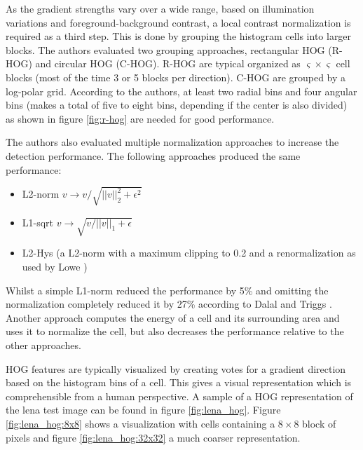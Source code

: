 As the gradient strengths vary over a wide range, based on illumination variations and foreground-background contrast, a local contrast normalization is required as a third step. This is done by grouping the histogram cells into larger blocks. The authors evaluated two grouping approaches, rectangular HOG (\acs{R-HOG}) and circular HOG (\acs{C-HOG}). \acs{R-HOG} are typical organized as $\varsigma \times \varsigma$ cell blocks (most of the time 3 or 5 blocks per direction). \acs{C-HOG} are grouped by a log-polar grid. According to the authors, at least two radial bins and four angular bins (makes a total of five to eight bins, depending if the center is also divided) as shown in figure \ref{fig:r-hog} are needed for good performance.



The authors also evaluated multiple normalization approaches to increase the detection performance.
The following approaches produced the same performance:
\begin{itemize}
	\item L2-norm $v \rightarrow v / \sqrt{||v||_2^2 + \epsilon^2}$
	\item L1-sqrt $v \rightarrow \sqrt{v / ||v||_1 + \epsilon}$
	\item L2-Hys (a L2-norm with a maximum clipping to 0.2 and a renormalization as used by Lowe \cite{Lowe2004})
\end{itemize}
Whilst a simple L1-norm reduced the performance by 5\% and omitting the normalization completely reduced it by 27\% according to Dalal and Triggs \cite{Dalal2005}. Another approach computes the energy of a cell and its surrounding area and uses it to normalize the cell, but also decreases the performance relative to the other approaches.

\ac{HOG} features are typically visualized by creating votes for a gradient direction based on the histogram bins of a cell. This gives a visual representation which is comprehensible from a human perspective. A sample of a \ac{HOG} representation of the lena test image can be found in figure \ref{fig:lena_hog}. Figure \ref{fig:lena_hog:8x8} shows a visualization with cells containing a $8\times8$ block of pixels and figure \ref{fig:lena_hog:32x32} a much coarser representation.

